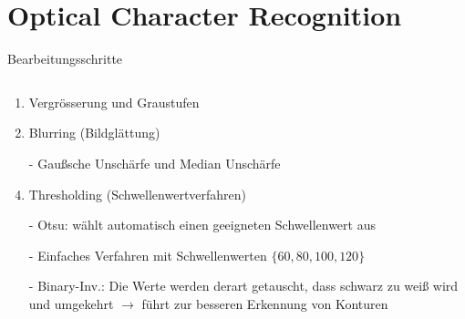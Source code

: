 \section{Optical Character Recognition}

\begin{frame}{Bearbeitungsschritte}
    \begin{columns}
        \begin{column}{0.6\textwidth}
            \begin{enumerate}
                \item {\small Vergr\"osserung und Graustufen}
                \item {\small Blurring (Bildgl\"attung)}
                \item[-] {\scriptsize Gaußsche Unsch\"arfe und Median Unsch\"arfe}
                \item {\small Thresholding (Schwellenwertverfahren)}

                \item[-] {\scriptsize Otsu: w\"ahlt automatisch einen geeigneten Schwellenwert aus}
                \item[-] {\scriptsize Einfaches Verfahren mit Schwellenwerten $\{60,80,100,120\}$}
                \item[-] {\scriptsize Binary-Inv.: Die Werte werden derart getauscht, dass schwarz zu weiß wird und umgekehrt $\rightarrow$ führt zur besseren Erkennung von Konturen}


\end{enumerate}
\end{column}
\end{columns}
\end{frame}
